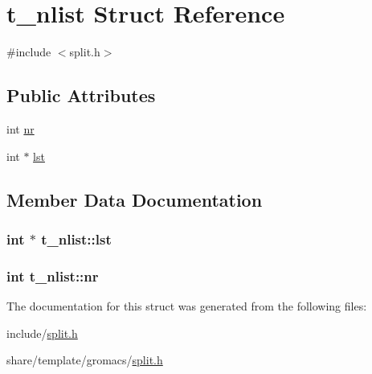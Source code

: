 \hypertarget{structt__nlist}{\section{t\-\_\-nlist \-Struct \-Reference}
\label{structt__nlist}
}


{\ttfamily \#include $<$split.\-h$>$}

\subsection*{\-Public \-Attributes}
\begin{DoxyCompactItemize}
\item 
int \hyperlink{structt__nlist_ac1a98e31f3fe23110025b5c6bb17e3cf}{nr}
\item 
int $\ast$ \hyperlink{structt__nlist_a6881fa2000f3912ddd45d16c52ed1d74}{lst}
\end{DoxyCompactItemize}


\subsection{\-Member \-Data \-Documentation}
\hypertarget{structt__nlist_a6881fa2000f3912ddd45d16c52ed1d74}{
\subsubsection[{lst}]{\setlength{\rightskip}{0pt plus 5cm}int $\ast$ {\bf t\-\_\-nlist\-::lst}}}\label{structt__nlist_a6881fa2000f3912ddd45d16c52ed1d74}
\hypertarget{structt__nlist_ac1a98e31f3fe23110025b5c6bb17e3cf}{
\subsubsection[{nr}]{\setlength{\rightskip}{0pt plus 5cm}int {\bf t\-\_\-nlist\-::nr}}}\label{structt__nlist_ac1a98e31f3fe23110025b5c6bb17e3cf}


\-The documentation for this struct was generated from the following files\-:\begin{DoxyCompactItemize}
\item 
include/\hyperlink{include_2split_8h}{split.\-h}\item 
share/template/gromacs/\hyperlink{share_2template_2gromacs_2split_8h}{split.\-h}\end{DoxyCompactItemize}
